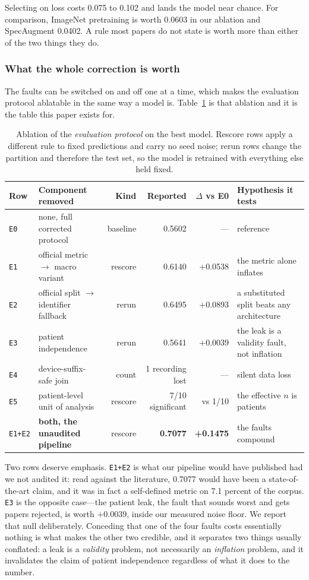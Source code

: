 \documentclass[journal,onecolumn]{IEEEtran}
\newcommand{\best}[1]{\textbf{#1}}
\begin{document}
Selecting on loss costs 0.075 to 0.102 and lands the model near chance. For comparison,
ImageNet pretraining is worth 0.0603 in our ablation and SpecAugment 0.0402. A rule most
papers do not state is worth more than either of the two things they do.

\subsubsection{What the whole correction is worth}
The faults can be switched on and off one at a time, which makes the evaluation protocol
ablatable in the same way a model is. Table~\ref{tab:protocol} is that ablation and it is
the table this paper exists for.

\begin{table}[!t]
\centering
\caption{Ablation of the \emph{evaluation protocol} on the best model. Rescore rows apply a
different rule to fixed predictions and carry no seed noise; rerun rows change the partition
and therefore the test set, so the model is retrained with everything else held fixed.}
\label{tab:protocol}
\footnotesize
\begin{tabular}{llrrrl}
\toprule
Row & Component removed & Kind & Reported & $\Delta$ vs E0 & Hypothesis it tests \\
\midrule
\texttt{E0} & none, full corrected protocol & baseline & 0.5602 & --- & reference \\
\texttt{E1} & official metric $\rightarrow$ macro variant & rescore & 0.6140 & +0.0538 & the metric alone inflates \\
\texttt{E2} & official split $\rightarrow$ identifier fallback & rerun & 0.6495 & +0.0893 & a substituted split beats any architecture \\
\texttt{E3} & patient independence & rerun & 0.5641 & +0.0039 & the leak is a validity fault, not inflation \\
\texttt{E4} & device-suffix-safe join & count & 1 recording lost & --- & silent data loss \\
\texttt{E5} & patient-level unit of analysis & rescore & 7/10 significant & vs 1/10 & the effective $n$ is patients \\
\midrule
\texttt{E1+E2} & \best{both, the unaudited pipeline} & rescore & \best{0.7077} & \best{+0.1475} & the faults compound \\
\bottomrule
\end{tabular}
\end{table}

Two rows deserve emphasis. \texttt{E1+E2} is what our pipeline would have published had we
not audited it: read against the literature, 0.7077 would have been a state-of-the-art
claim, and it was in fact a self-defined metric on 7.1 percent of the corpus. \texttt{E3} is
the opposite case---the patient leak, the fault that sounds worst and gets papers rejected,
is worth $+0.0039$, inside our measured noise floor. We report that null deliberately.
Conceding that one of the four faults costs essentially nothing is what makes the other two
credible, and it separates two things usually conflated: a leak is a \emph{validity} problem,
not necessarily an \emph{inflation} problem, and it invalidates the claim of patient
independence regardless of what it does to the number.
\end{document}
